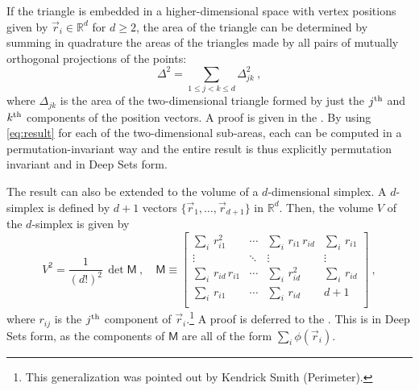 \documentclass[10pt]{article}
\begin{document}
If the triangle is embedded in a higher-dimensional space with vertex positions given by $\vec{r}_i \in \mathbb{R}^{d}$ for $d \geq 2$, the area of the triangle can be determined by summing in quadrature the areas of the triangles made by all pairs of mutually orthogonal projections of the points:
\begin{equation}
    \Delta^2 = \sum_{1 \leq j < k \leq d} \Delta_{jk}^2~, 
    \label{eq:quadrature}
\end{equation}
where $\Delta_{jk}$ is the area of the two-dimensional triangle formed by just the $j^{\rm th}$ and $k^{\rm th}$ components of the position vectors.
A proof is given in the .
By using \eqref{eq:result} for each of the two-dimensional sub-areas, each can be computed in a permutation-invariant way and the entire result is thus explicitly permutation invariant and in Deep Sets form.

The result can also be extended to the volume of a $d$-dimensional simplex.
A $d$-simplex is defined by $d+1$ vectors $\{ \vec{r}_1, \dots, \vec{r}_{d+1} \}$ in $\mathbb{R}^d$.
Then, the volume $V$ of the $d$-simplex is given by
\begin{equation}
    V^2 = \frac{1}{(d!)^2} \, \det \mathsf{M}~,
    \quad
    \mathsf{M} \equiv \left[\begin{array}{cccc}
        \sum_i \, r_{i1}^2
            & \cdots 
            & \sum_i \, r_{i1} \, r_{id}
            & \sum_i \, r_{i1} \\
        \vdots
            & \ddots 
            & \vdots
            & \vdots \\
        \sum_i \, r_{id} \, r_{i1}
            & \cdots 
            & \sum_i \, r_{id}^2
            & \sum_i \, r_{id} \\
        \sum_i \, r_{i1}
            & \cdots 
            & \sum_i \, r_{id}
            & d + 1 \\
    \end{array}\right]~,
    \label{eq:dsimplex}
\end{equation}
where $r_{ij}$ is the $j^{\rm th}$ component of $\vec{r}_i$.\footnote{%
    This generalization was pointed out by Kendrick Smith (Perimeter).}
A proof is deferred to the .
This is in Deep Sets form, as the components of $\mathsf{M}$ are all of the form $\sum_i \phi(\vec{r}_i)$.
\end{document}
